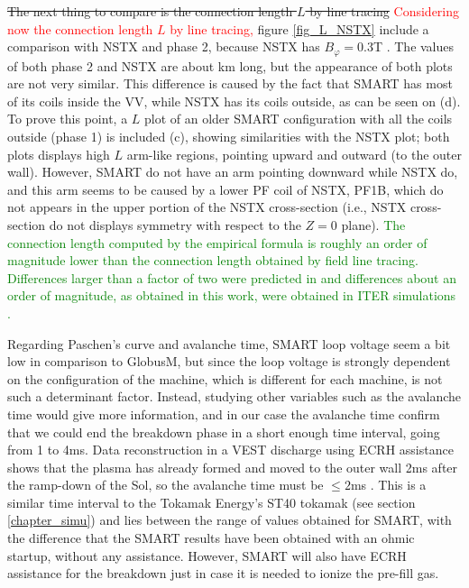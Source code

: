 \documentclass[a4paper,12pt,oneside]{book}
\begin{document}
\st{The next thing to compare is the connection length $L$ by line tracing} \textcolor{red}{Considering now the connection length $L$ by line tracing,} figure \ref{fig_L_NSTX} include a comparison with NSTX and phase 2, because NSTX has $B_\varphi=0.3$T \cite{NSTX_BT}. The values of both phase 2 and NSTX are about km long, but the appearance of both plots are not very similar. This difference is caused by the fact that SMART has most of its coils inside the VV, while NSTX has its coils outside, as can be seen on (d). To prove this point, a $L$ plot of an older SMART configuration with all the coils outside (phase 1) is included (c), showing similarities with the NSTX plot; both plots displays high $L$ arm-like regions, pointing upward and outward (to the outer wall). However, SMART do not have an arm pointing downward while NSTX do, and this arm seems to be caused by a lower PF coil of NSTX, PF1B, which do not appears in the upper portion of the NSTX cross-section (i.e., NSTX cross-section do not displays symmetry with respect to the $Z=0$ plane). \textcolor{green}{The connection length computed by the empirical formula is roughly an order of magnitude lower than the connection length obtained by field line tracing. Differences larger than a factor of two were predicted in \cite{Lloyd_1991} and differences about an order of magnitude, as obtained in this work, were obtained in ITER simulations \cite{ITER_2007}.}

Regarding Paschen's curve and avalanche time, SMART loop voltage seem a bit low in comparison to GlobusM, but since the loop voltage is strongly dependent on the configuration of the machine, which is different for each machine, is not such a determinant factor. Instead, studying other variables such as the avalanche time would give more information, and in our case the avalanche time confirm that we could end the breakdown phase in a short enough time interval, going from 1 to 4ms. Data reconstruction in a VEST discharge using ECRH assistance shows that the plasma has already formed and moved to the outer wall 2ms after the ramp-down of the Sol, so the avalanche time must be $\leq 2$ms \cite{VEST_2015}. This is a similar time interval to the Tokamak Energy's ST40 tokamak (see section \ref{chapter_simu}) and lies between the range of values obtained for SMART, with the difference that the SMART results have been obtained with an ohmic startup, without any assistance. However, SMART will also have ECRH assistance for the breakdown just in case it is needed to ionize the pre-fill gas.
\end{document}
